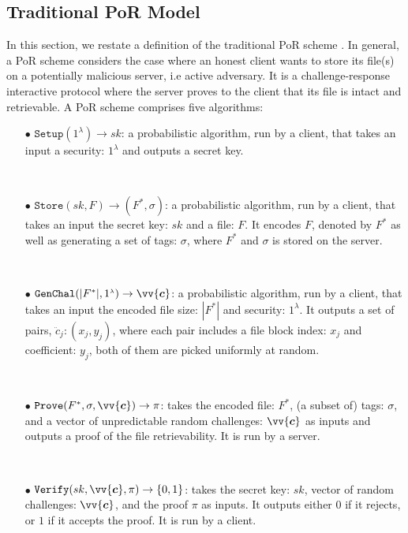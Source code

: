\subsection {Traditional PoR Model}\label{PoR-Model}

In this section, we restate a  definition of the traditional PoR scheme \cite{DBLP:conf/asiacrypt/ShachamW08}. In general, a PoR scheme considers the case where an honest client wants to store its file(s) on a  potentially malicious server, i.e active adversary. It is a challenge-response interactive protocol where the server proves to the client that its file is intact and retrievable. A PoR scheme comprises five algorithms: 

\begin{itemize}
\item[$\bullet$] $\mathtt{Setup}(1^{\scriptscriptstyle\lambda})\rightarrow sk$:  a probabilistic algorithm, run by a client, that takes an input a security:  $1^{\scriptscriptstyle\lambda}$ and outputs a secret key.

\

\item[$\bullet$] $\mathtt{Store}(sk,F)\rightarrow (F^{*}, \sigma)$: a probabilistic algorithm, run by a client, that takes an input the secret key: $sk$ and a file: $F$. It encodes $F$, denoted by $F^{*}$ as well as generating a set of  tags: $\sigma$, where $F^{*}$ and  $\sigma$ is stored on the server.

\

\item[$\bullet$] $\mathtt{GenChal}(|F^{*}|, 1^{\scriptscriptstyle\lambda})\rightarrow \vv{\bm{c}}$: a probabilistic algorithm, run by a client, that takes an input the encoded file size: $|F^{*}|$ and security:  $1^{\scriptscriptstyle\lambda}$. It outputs a set of pairs, $\ddot{c}_{\scriptscriptstyle j}:(x_{\scriptscriptstyle j},y_{\scriptscriptstyle j})$, where each pair includes a file block index: $x_{\scriptscriptstyle j}$ and coefficient: $y_{\scriptscriptstyle j}$, both of them are picked uniformly at random.

\

\item[$\bullet$] $\mathtt{Prove}(F^{*}, \sigma, \vv{\bm{c}})\rightarrow \pi$:  takes the encoded file: $F^{*}$, (a subset of) tags: $\sigma$, and a vector of unpredictable random challenges: $\vv{\bm{c}}$ as inputs and outputs a proof of the file retrievability. It is run by a server.

\

\item[$\bullet$] $\mathtt{Verify}(sk,\vv{\bm{c}}, \pi)\rightarrow\{0,1\}$: takes the secret key: $sk$,  vector of random challenges: $\vv{\bm{c}}$, and the proof $\pi$ as inputs. It outputs either $0$ if it rejects,  or $1$ if it accepts the proof. It is run by a client.

\end{itemize}


